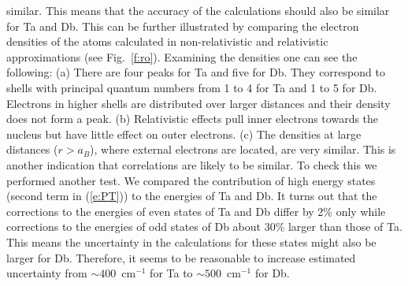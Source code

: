 \documentclass[10pt,a4paper, twoside]{report}
\begin{document}
similar. This means that the accuracy of the calculations should also be similar for Ta and Db.
This can be further illustrated by comparing the electron densities of the atoms calculated in non-relativistic and relativistic
approximations (see Fig.~\ref{f:ro}). Examining the densities one can see the following:
(a) There are four peaks for Ta and five for Db. They correspond to shells with principal quantum numbers from 1 to 4 for
Ta and 1 to 5 for Db. Electrons in higher shells are distributed over larger distances and their density does not form a peak.
(b)  Relativistic effects pull inner electrons towards the nucleus but have little effect on outer electrons.
(c) The densities at large distances ($r>a_B$), where external electrons are located, are very similar.
This is another indication that correlations are likely to be similar.  To check this we performed another test. We
compared the contribution of high energy states (second term in (\ref{e:PT})) to the energies of Ta and Db.
It turns out that the corrections to the energies of even states of Ta and Db differ by 2\% only while corrections to 
the energies of odd states of Db about 30\% larger than those of Ta. This means the uncertainty in the calculations for these
states might also be larger for Db. Therefore, it seems to be reasonable to increase estimated uncertainty from 
$ \sim 400$~cm$^{-1}$ for Ta to $ \sim 500$~cm$^{-1}$ for Db.
\end{document}
